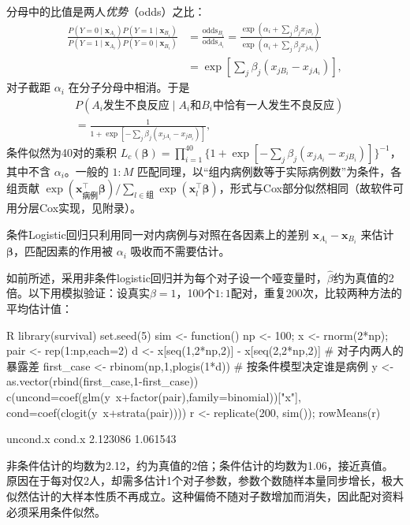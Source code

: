 分母中的比值是两人\emph{优势}（odds）之比：
\begin{align*}
\frac{P(Y=0\mid \bm x_{A_i})P(Y=1\mid \bm x_{B_i})}{P(Y=1\mid \bm x_{A_i})P(Y=0\mid \bm x_{B_i})}
&=\frac{\text{odds}_{B_i}}{\text{odds}_{A_i}}
=\frac{\exp(\alpha_i+\sum_j\beta_jx_{jB_i})}{\exp(\alpha_i+\sum_j\beta_jx_{jA_i})}\\
&=\exp\left[\sum_j\beta_j(x_{jB_i}-x_{jA_i})\right],
\end{align*}
对子截距 $\alpha_i$ 在分子分母中相消。于是
\begin{align*}
& P(A_i\text{发生不良反应}\mid A_i\text{和}B_i\text{中恰有一人发生不良反应})\\
&=\frac{1}{1+\exp[-\sum_j\beta_j(x_{jA_i}-x_{jB_i})]},
\end{align*}
条件似然为40对的乘积 $L_c(\bm\beta)=\prod_{i=1}^{40}\{1+\exp[-\sum_j\beta_j(x_{jA_i}-x_{jB_i})]\}^{-1}$，其中不含 $\alpha_i$。一般的 $1:M$ 匹配同理，以“组内病例数等于实际病例数”为条件，各组贡献 $\exp(\bm x_{\text{病例}}^\top\bm\beta)/\sum_{l\in\text{组}}\exp(\bm x_l^\top\bm\beta)$，形式与Cox部分似然相同（故软件可用分层Cox实现，见附录）。
\begin{annotation}
条件Logistic回归只利用同一对内病例与对照在各因素上的差别 $\bm x_{A_i}-\bm x_{B_i}$ 来估计 $\bm\beta$，匹配因素的作用被 $\alpha_i$ 吸收而不需要估计。
\end{annotation}
\begin{sikao}[对子参数不能直接估计的原因]
如前所述，采用非条件logistic回归并为每个对子设一个哑变量时，$\widehat\beta$约为真值的2倍。以下用模拟验证：设真实$\beta=1$，100个$1:1$配对，重复200次，比较两种方法的平均估计值：
\par\noindent
\begin{coursecode}{R}
library(survival)
set.seed(5)
sim <- function(){
  np <- 100; x <- rnorm(2*np); pair <- rep(1:np,each=2)
  d <- x[seq(1,2*np,2)] - x[seq(2,2*np,2)]          # 对子内两人的暴露差
  first_case <- rbinom(np,1,plogis(1*d))            # 按条件模型决定谁是病例
  y <- as.vector(rbind(first_case,1-first_case))
  c(uncond=coef(glm(y~x+factor(pair),family=binomial))["x"],
    cond=coef(clogit(y~x+strata(pair))))
}
r <- replicate(200, sim()); rowMeans(r)
\end{coursecode}
\begin{routput}
uncond.x   cond.x 
2.123086 1.061543
\end{routput}
非条件估计的均数为2.12，约为真值的2倍；条件估计的均数为1.06，接近真值。原因在于每对仅2人，却需多估计1个对子参数，参数个数随样本量同步增长，极大似然估计的大样本性质不再成立。这种偏倚不随对子数增加而消失，因此配对资料必须采用条件似然。
\end{sikao}
